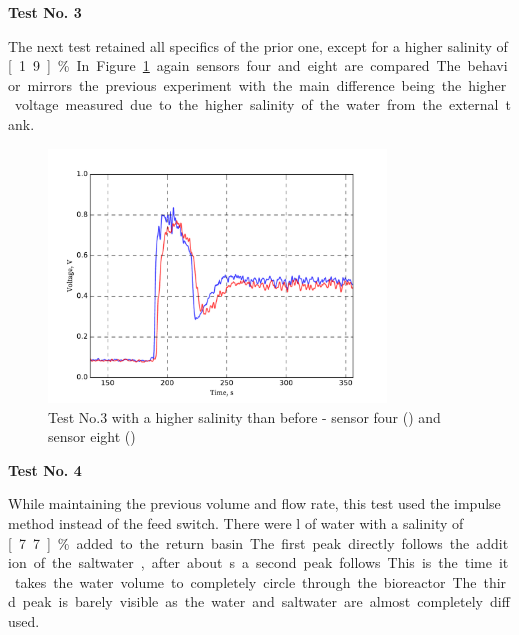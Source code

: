 \textbf{Test No. 3}

The next test retained all specifics of the prior one, except for a higher salinity of \unit[1.9]{\%}. In Figure \ref{fig:test3} again sensors four and eight are compared. The behavior mirrors the previous experiment with the main difference being the higher voltage measured due to the higher salinity of the water from the external tank.

\begin{figure}[H]
	\begin{center}
		\includegraphics[width=0.8\textwidth]{images/log080716_3.pdf} 
		\caption{Test No.3 with a higher salinity than before - sensor four (\drawline[blue]) and sensor eight (\drawline[red])}
		\label{fig:test3}
	\end{center}
\end{figure}

\textbf{Test No. 4}

While maintaining the previous volume and flow rate, this test used the impulse method instead of the feed switch. There were \unit[5]{l} of water with a salinity of \unit[7.7]{\%} added to the return basin. The first peak directly follows the addition of the saltwater, after about \unit[50]{s} a second peak follows. This is the time it takes the water volume to completely circle through the bioreactor. The third peak is barely visible as the water and saltwater are almost completely diffused.

